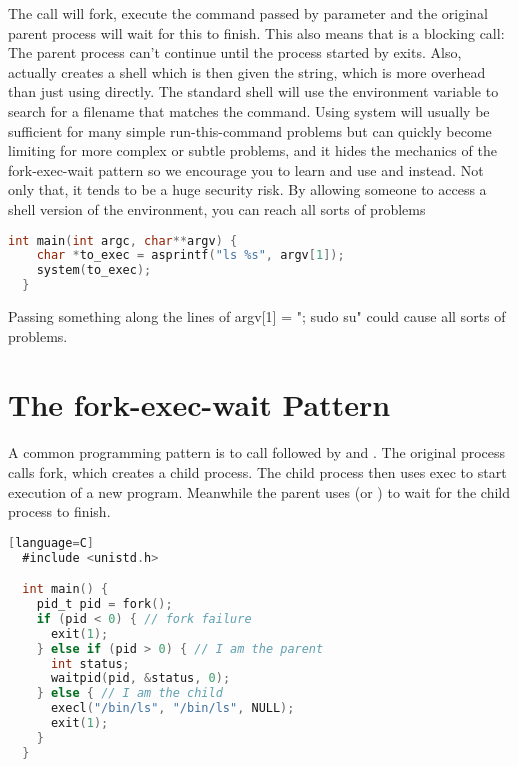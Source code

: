 The  call will fork, execute the command passed by parameter and the original parent process will wait for this to finish.
This also means that  is a blocking call: The parent process can't continue until the process started by  exits.
Also,  actually creates a shell which is then given the string, which is more overhead than just using  directly.
The standard shell will use the  environment variable to search for a filename that matches the command. Using system will usually be sufficient for many simple run-this-command problems but can quickly become limiting for more complex or subtle problems, and it hides the mechanics of the fork-exec-wait pattern so we encourage you to learn and use   and  instead.
Not only that, it tends to be a huge security risk. By allowing someone to access a shell version of the environment, you can reach all sorts of problems

\begin{lstlisting}[language=C]
  int main(int argc, char**argv) {
    char *to_exec = asprintf("ls %s", argv[1]); 
    system(to_exec);
  }
\end{lstlisting}

Passing something along the lines of argv[1] = "; sudo su" could cause all sorts of problems.

\section{The fork-exec-wait Pattern}

A common programming pattern is to call  followed by  and .
The original process calls fork, which creates a child process.
The child process then uses exec to start execution of a new program.
Meanwhile the parent uses  (or ) to wait for the child process to finish. 

\begin{lstlisting}[language=C][language=C]
  #include <unistd.h>

  int main() {
    pid_t pid = fork();
    if (pid < 0) { // fork failure
      exit(1);
    } else if (pid > 0) { // I am the parent
      int status;
      waitpid(pid, &status, 0);
    } else { // I am the child
      execl("/bin/ls", "/bin/ls", NULL);
      exit(1);
    }
  }
\end{lstlisting}

